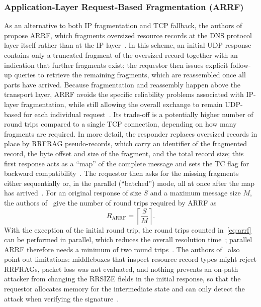 \documentclass[conference]{IEEEtran}
\begin{document}
\subsubsection{Application-Layer Request-Based Fragmentation (ARRF)}
\label{sec:arrf}

As an alternative to both IP fragmentation and TCP fallback, the authors
of~\cite{arrf} propose ARRF, which fragments oversized resource records at the
DNS protocol layer itself rather than at the IP layer~\cite{arrf}. In this
scheme, an initial UDP response contains only a truncated fragment of the
oversized record together with an indication that further fragments exist; the
requestor then issues explicit follow-up queries to retrieve the remaining
fragments, which are reassembled once all parts have arrived. Because
fragmentation and reassembly happen above the transport layer, ARRF avoids the
specific reliability problems associated with IP-layer fragmentation, while
still allowing the overall exchange to remain UDP-based for each individual
request~\cite{arrf}. Its trade-off is a potentially higher number of round
trips compared to a single TCP connection, depending on how many fragments are
required. In more detail, the responder replaces oversized records in place by
RRFRAG pseudo-records, which carry an identifier of the fragmented record, the
byte offset and size of the fragment, and the total record size; this first
response acts as a ``map'' of the complete message and sets the TC flag for
backward compatibility~\cite{arrf}. The requestor then asks for the missing
fragments either sequentially or, in the parallel (``batched'') mode, all at
once after the map has arrived~\cite{arrf}. For an original response of size
$S$ and a maximum message size $M$, the authors of~\cite{arrf} give the number
of round trips required by ARRF as
\begin{equation}
R_\text{ARRF} = \left\lceil \frac{S}{M} \right\rceil .
\label{eq:arrf}
\end{equation}
With the exception of the initial round trip, the round trips counted
in~\eqref{eq:arrf} can be performed in parallel, which reduces the overall
resolution time~\cite{arrf}; parallel ARRF therefore needs a minimum of two round
trips~\cite{turbodns}. The authors of~\cite{arrf} also point out limitations:
middleboxes that inspect resource record types might reject RRFRAGs, packet
loss was not evaluated, and nothing prevents an on-path attacker from changing
the RRSIZE fields in the initial response, so that the requestor allocates
memory for the intermediate state and can only detect the attack when
verifying the signature~\cite{arrf}.
\end{document}
